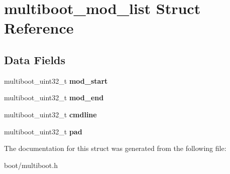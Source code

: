 \hypertarget{structmultiboot__mod__list}{
\section{multiboot\_\-mod\_\-list Struct Reference}
\label{structmultiboot__mod__list}
}
\subsection*{Data Fields}
\begin{DoxyCompactItemize}
\item 
\hypertarget{structmultiboot__mod__list_afe0e2af1e8c0297c17a7771bd1a62e0f}{
multiboot\_\-uint32\_\-t {\bfseries mod\_\-start}}
\label{structmultiboot__mod__list_afe0e2af1e8c0297c17a7771bd1a62e0f}

\item 
\hypertarget{structmultiboot__mod__list_a75b0899f1e1f90d4ff629b7136f5b988}{
multiboot\_\-uint32\_\-t {\bfseries mod\_\-end}}
\label{structmultiboot__mod__list_a75b0899f1e1f90d4ff629b7136f5b988}

\item 
\hypertarget{structmultiboot__mod__list_a31365a9d2d0cae071f5cb8bddb9b33fb}{
multiboot\_\-uint32\_\-t {\bfseries cmdline}}
\label{structmultiboot__mod__list_a31365a9d2d0cae071f5cb8bddb9b33fb}

\item 
\hypertarget{structmultiboot__mod__list_a63d98e6d313098a4d35b828e204a4e0c}{
multiboot\_\-uint32\_\-t {\bfseries pad}}
\label{structmultiboot__mod__list_a63d98e6d313098a4d35b828e204a4e0c}

\end{DoxyCompactItemize}


The documentation for this struct was generated from the following file:\begin{DoxyCompactItemize}
\item 
boot/multiboot.h\end{DoxyCompactItemize}
